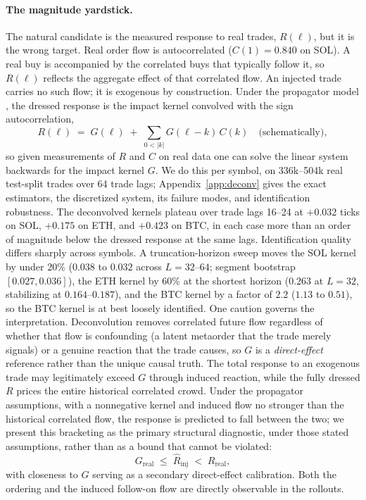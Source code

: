 \documentclass[11pt]{article}
\begin{document}
\paragraph{The magnitude yardstick.} The natural candidate is the measured response to real trades, $R(\ell)$, but it is the wrong target. Real order flow is autocorrelated ($C(1)=0.840$ on SOL). A real buy is accompanied by the correlated buys that typically follow it, so $R(\ell)$ reflects the aggregate effect of that correlated flow. An injected trade carries no such flow; it is exogenous by construction. Under the propagator model \citep{bouchaud2004,taranto2016}, the dressed response is the impact kernel convolved with the sign autocorrelation,
\[
R(\ell) \;=\; G(\ell) \;+\; \sum_{0 < |k|} G(\ell - k)\, C(k) \quad\text{(schematically)},
\]
so given measurements of $R$ and $C$ on real data one can solve the linear system backwards for the impact kernel $G$. We do this per symbol, on 336k--504k real test-split trades over 64 trade lags; Appendix~\ref{app:deconv} gives the exact estimators, the discretized system, its failure modes, and identification robustness. The deconvolved kernels plateau over trade lags 16--24 at $+0.032$ ticks on SOL, $+0.175$ on ETH, and $+0.423$ on BTC, in each case more than an order of magnitude below the dressed response at the same lags. Identification quality differs sharply across symbols. A truncation-horizon sweep moves the SOL kernel by under 20\% ($0.038$ to $0.032$ across $L=32$--$64$; segment bootstrap $[0.027, 0.036]$), the ETH kernel by 60\% at the shortest horizon ($0.263$ at $L=32$, stabilizing at $0.164$--$0.187$), and the BTC kernel by a factor of $2.2$ ($1.13$ to $0.51$), so the BTC kernel is at best loosely identified. One caution governs the interpretation. Deconvolution removes correlated future flow regardless of whether that flow is confounding (a latent metaorder that the trade merely signals) or a genuine reaction that the trade causes, so $G$ is a \emph{direct-effect} reference rather than the unique causal truth. The total response to an exogenous trade may legitimately exceed $G$ through induced reaction, while the fully dressed $R$ prices the entire historical correlated crowd. Under the propagator assumptions, with a nonnegative kernel and induced flow no stronger than the historical correlated flow, the response is predicted to fall between the two; we present this bracketing as the primary structural diagnostic, under those stated assumptions, rather than as a bound that cannot be violated:
\[
G_{\mathrm{real}} \;\le\; \hat{R}_{\mathrm{inj}} \;<\; R_{\mathrm{real}},
\]
with closeness to $G$ serving as a secondary direct-effect calibration. Both the ordering and the induced follow-on flow are directly observable in the rollouts.
\end{document}

